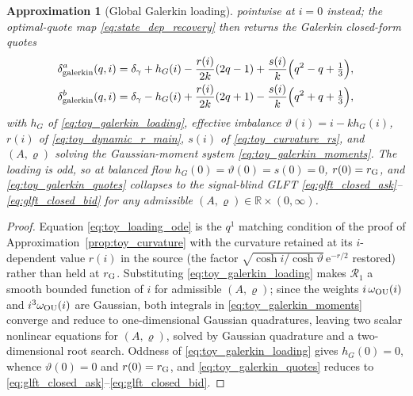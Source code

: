\documentclass[11pt,a4paper]{article}
\newcommand{\R}{\mathbb{R}}
\newcommand{\e}{\mathrm e}
\theoremstyle{plain}
\newtheorem{approximation}[proposition]{Approximation}
\theoremstyle{definition}
\begin{document}
\begin{approximation}[Global Galerkin loading]
pointwise at \(i=0\) instead; the optimal-quote map
\eqref{eq:state_dep_recovery} then returns the Galerkin closed-form quotes
\begin{align}
\delta_{\rm galerkin}^a(q,i)&=\delta_\gamma+h_G(i)-\frac{r(i)}{2k}(2q-1)
+\frac{s(i)}{k}\Bigl(q^2-q+\tfrac13\Bigr),\notag\\
\delta_{\rm galerkin}^b(q,i)&=\delta_\gamma-h_G(i)+\frac{r(i)}{2k}(2q+1)
-\frac{s(i)}{k}\Bigl(q^2+q+\tfrac13\Bigr),\label{eq:toy_galerkin_quotes}
\end{align}
with \(h_G\) of \eqref{eq:toy_galerkin_loading}, effective imbalance
\(\vartheta(i)=i-kh_G(i)\), \(r(i)\) of \eqref{eq:toy_dynamic_r_main},
\(s(i)\) of \eqref{eq:toy_curvature_rs}, and \((A,\varrho)\) solving the
Gaussian-moment system \eqref{eq:toy_galerkin_moments}.  The loading is odd,
so at balanced flow \(h_G(0)=\vartheta(0)=s(0)=0\), \(r(0)=r_{\rm G}\), and
\eqref{eq:toy_galerkin_quotes} collapses to the signal-blind GLFT
\eqref{eq:glft_closed_ask}--\eqref{eq:glft_closed_bid} for any admissible
\((A,\varrho)\in\R\times(0,\infty)\).
\end{approximation}

\begin{proof}
Equation \eqref{eq:toy_loading_ode} is the \(q^1\) matching condition of the proof of
Approximation~\ref{prop:toy_curvature} with the curvature retained at its
\(i\)-dependent value \(r(i)\) in the source (the factor
\(\sqrt{\cosh i/\cosh\vartheta}\,\e^{-r/2}\) restored) rather than held at
\(r_{\rm G}\).  Substituting \eqref{eq:toy_galerkin_loading} makes \(\mathcal R_1\) a
smooth bounded function of \(i\) for admissible \((A,\varrho)\); since the weights
\(i\,\omega_{\rm OU}(i)\) and \(i^3\omega_{\rm OU}(i)\) are Gaussian, both integrals in
\eqref{eq:toy_galerkin_moments} converge and reduce to one-dimensional Gaussian
quadratures, leaving two scalar nonlinear equations for \((A,\varrho)\), solved by
Gaussian quadrature and a two-dimensional root search.  Oddness of
\eqref{eq:toy_galerkin_loading} gives \(h_G(0)=0\), whence \(\vartheta(0)=0\) and
\(r(0)=r_{\rm G}\), and \eqref{eq:toy_galerkin_quotes} reduces to
\eqref{eq:glft_closed_ask}--\eqref{eq:glft_closed_bid}.
\end{proof}
\end{document}

